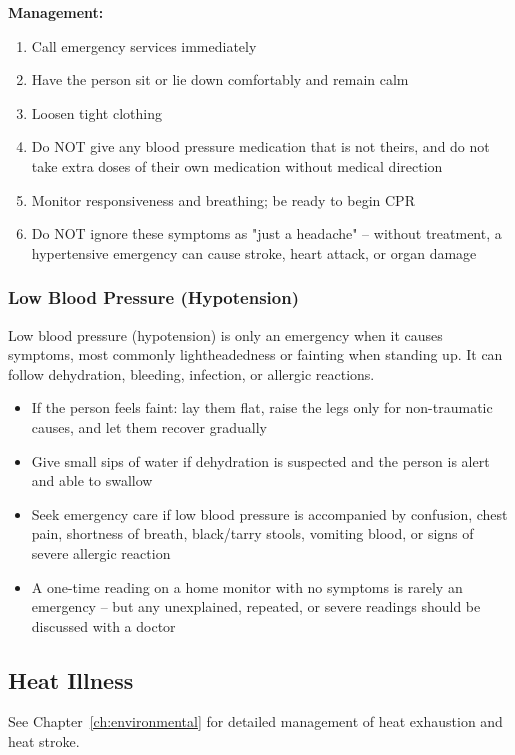 \textbf{Management:}
\begin{enumerate}[leftmargin=*]
  \item Call emergency services immediately
  \item Have the person sit or lie down comfortably and remain calm
  \item Loosen tight clothing
  \item Do NOT give any blood pressure medication that is not theirs, and do not take extra doses of their own medication without medical direction
  \item Monitor responsiveness and breathing; be ready to begin CPR
  \item Do NOT ignore these symptoms as "just a headache" -- without treatment, a hypertensive emergency can cause stroke, heart attack, or organ damage
\end{enumerate}
\subsubsection{Low Blood Pressure (Hypotension)}

Low blood pressure (hypotension) is only an emergency when it causes symptoms, most commonly lightheadedness or fainting when standing up. It can follow dehydration, bleeding, infection, or allergic reactions.

\begin{itemize}[leftmargin=*]
  \item If the person feels faint: lay them flat, raise the legs only for non-traumatic causes, and let them recover gradually
  \item Give small sips of water if dehydration is suspected and the person is alert and able to swallow
  \item Seek emergency care if low blood pressure is accompanied by confusion, chest pain, shortness of breath, black/tarry stools, vomiting blood, or signs of severe allergic reaction
  \item A one-time reading on a home monitor with no symptoms is rarely an emergency -- but any unexplained, repeated, or severe readings should be discussed with a doctor
\end{itemize}

\subsection{Heat Illness}

See Chapter~\ref{ch:environmental} for detailed management of heat exhaustion and heat stroke.


